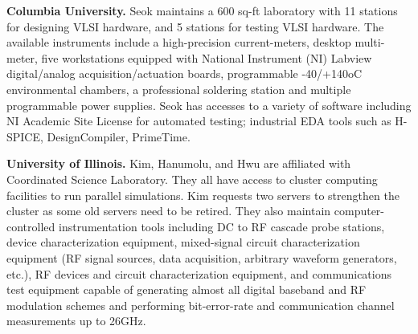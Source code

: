 \noindent
\textbf{Columbia University.} 
Seok maintains a 600 sq-ft laboratory with 11 stations for designing VLSI hardware, and 5 stations for testing VLSI hardware. 
The available instruments include a high-precision current-meters, desktop multi-meter, five workstations equipped with National Instrument (NI) Labview digital/analog acquisition/actuation boards, programmable -40/+140oC environmental chambers, a professional soldering station and multiple programmable power supplies. 
Seok has accesses to a variety of software including NI Academic Site License for automated testing; industrial EDA tools such as H-SPICE, DesignCompiler, PrimeTime. %

\vspace{3pt}
\noindent
\textbf{University of Illinois.}
Kim, Hanumolu, and Hwu are affiliated with Coordinated Science Laboratory. 
They all have access to cluster computing facilities to run parallel simulations. 
Kim requests two servers to strengthen the cluster as some old servers need to be retired. 
They also maintain computer-controlled instrumentation tools including DC to RF cascade probe stations, device characterization equipment, 
mixed-signal circuit characterization equipment (RF signal sources, data acquisition, arbitrary waveform generators, etc.), RF devices and circuit characterization equipment, 
and communications test equipment capable of generating almost all digital baseband and RF modulation schemes and performing bit-error-rate and communication channel measurements up to 26GHz. 


